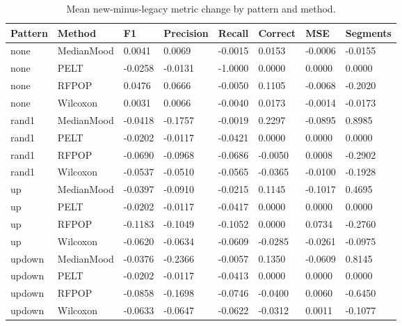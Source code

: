 \begin{table}[ht]
\centering
\caption{Mean new-minus-legacy metric change by pattern and method.}
\begin{tabular}{llllllll}
\toprule
Pattern & Method & F1 & Precision & Recall & Correct & MSE & Segments
 \\
\midrule
none & MedianMood & 0.0041 & 0.0069 & -0.0015 & 0.0153 & -0.0006 & -0.0155 \\
none & PELT & -0.0258 & -0.0131 & -1.0000 & 0.0000 & 0.0000 & 0.0000 \\
none & RFPOP & 0.0476 & 0.0666 & -0.0050 & 0.1105 & -0.0068 & -0.2020 \\
none & Wilcoxon & 0.0031 & 0.0066 & -0.0040 & 0.0173 & -0.0014 & -0.0173 \\
rand1 & MedianMood & -0.0418 & -0.1757 & -0.0019 & 0.2297 & -0.0895 & 0.8985 \\
rand1 & PELT & -0.0202 & -0.0117 & -0.0421 & 0.0000 & 0.0000 & 0.0000 \\
rand1 & RFPOP & -0.0690 & -0.0968 & -0.0686 & -0.0050 & 0.0008 & -0.2902 \\
rand1 & Wilcoxon & -0.0537 & -0.0510 & -0.0565 & -0.0365 & -0.0100 & -0.1928 \\
up & MedianMood & -0.0397 & -0.0910 & -0.0215 & 0.1145 & -0.1017 & 0.4695 \\
up & PELT & -0.0202 & -0.0117 & -0.0417 & 0.0000 & 0.0000 & 0.0000 \\
up & RFPOP & -0.1183 & -0.1049 & -0.1052 & 0.0000 & 0.0734 & -0.2760 \\
up & Wilcoxon & -0.0620 & -0.0634 & -0.0609 & -0.0285 & -0.0261 & -0.0975 \\
updown & MedianMood & -0.0376 & -0.2366 & -0.0057 & 0.1350 & -0.0609 & 0.8145 \\
updown & PELT & -0.0202 & -0.0117 & -0.0413 & 0.0000 & 0.0000 & 0.0000 \\
updown & RFPOP & -0.0858 & -0.1698 & -0.0746 & -0.0400 & 0.0060 & -0.6450 \\
updown & Wilcoxon & -0.0633 & -0.0647 & -0.0622 & -0.0312 & 0.0011 & -0.1077 \\
\bottomrule
\end{tabular}
\end{table}
